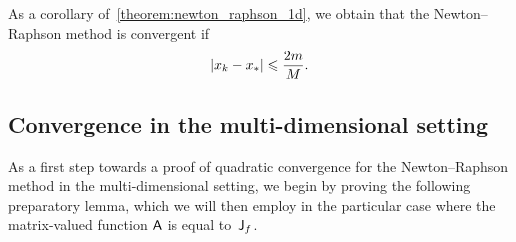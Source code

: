 \begin{remark}
    As a corollary of~\cref{theorem:newton_raphson_1d},
    we obtain that the Newton--Raphson method is convergent if
    \[
        \lvert x_k - x_*\rvert \leqslant \frac{2m}{M}.
    \]
\end{remark}

\subsection*{Convergence in the multi-dimensional setting~\moreinfo}
As a first step towards a proof of quadratic convergence for the Newton--Raphson method in the multi-dimensional setting,
we begin by proving the following preparatory lemma,
which we will then employ in the particular case where the matrix-valued function $\mathsf A$ is equal to~$\mathsf J_f$.

